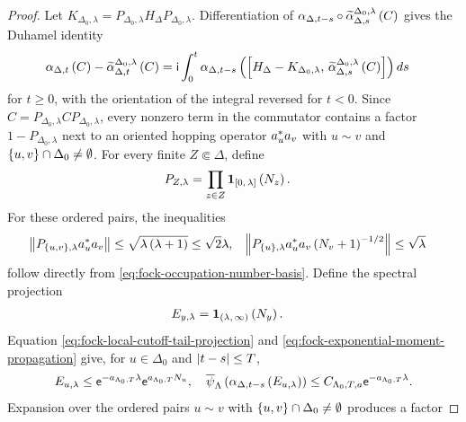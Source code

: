 \documentclass[11pt,a4paper]{article}
\theoremstyle{plain}
\theoremstyle{definition}
\theoremstyle{remark}
\begin{document}
\begin{proof}
Let $K_{\Delta_0,\lambda}=P_{\Delta_0,\lambda}H_{\Delta}P_{\Delta_0,\lambda}$.
Differentiation of
$\alpha_{\Delta,t-s}\circ\widetilde{\alpha}_{\Delta,s}^{\Delta_0,\lambda} \left( C \right)$ gives the Duhamel identity
\begin{equation}
\begin{aligned}
\fun{\alpha_{\Delta,t}}{C}
-
\fun{\widetilde{\alpha}_{\Delta,t}^{\Delta_0,\lambda}}{C}
& =
\imunit
\int_{0}^{t}
\fun{\alpha_{\Delta,t-s}}{
\commutator{
H_{\Delta}-K_{\Delta_0,\lambda}}{
\fun{\widetilde{\alpha}_{\Delta,s}^{\Delta_0,\lambda}}{C}}}
\opdmsr{s}
\end{aligned}
\label{eq:fock-cutoff-duhamel-identity}
\end{equation}
for $t\geq0$, with the orientation of the integral reversed for $t<0$.
Since $C=P_{\Delta_0,\lambda}CP_{\Delta_0,\lambda}$, every nonzero term in the commutator contains a factor
$1-P_{\Delta_0,\lambda}$ next to an oriented hopping operator $a_u^{\ast}a_v$ with
$u\sim v$ and $\left\{ u,v \right\}\cap \Delta_0\neq\emptyset$.
For every finite $Z\Subset \Delta$, define
$$\begin{aligned}
P_{Z,\lambda}
& =
\prod_{z\in Z}\boldsymbol{1}_{\left[ 0,\,\lambda \right]} \left( N_z \right).
\end{aligned}$$
For these ordered pairs, the inequalities
$$\begin{aligned}
\left\Vert P_{\left\{ u,v \right\},\lambda}a_u^{\ast}a_v \right\Vert
& \leq
\sqrt{\lambda\left( \lambda+1 \right)}
\leq
\sqrt{2}\lambda,
&
\left\Vert P_{\left\{ u \right\},\lambda}a_u^{\ast}a_v\left( N_v+1 \right)^{-1/2} \right\Vert
& \leq
\sqrt{\lambda}
\end{aligned}$$
follow directly from \eqref{eq:fock-occupation-number-basis}.
Define the spectral projection
\begin{equation}
\begin{aligned}
E_{y,\lambda}
& =
\boldsymbol{1}_{\left( \lambda,\,\infty \right)} \left( N_y \right).
\end{aligned}
\label{eq:fock-local-cutoff-tail-projection}
\end{equation}
Equation \eqref{eq:fock-local-cutoff-tail-projection} and
\eqref{eq:fock-exponential-moment-propagation} give, for $u\in \Delta_0$ and $\left| t-s \right|\leq T$,
$$\begin{aligned}
E_{u,\lambda}
\leq
\napiernum^{-a_{\Lambda_0,T}\lambda}\napiernum^{a_{\Lambda_0,T}N_u},
\quad
\fun{\oastate[\overline{\psi}_{\Lambda}]}{
\fun{\alpha_{\Delta,t-s}}{E_{u,\lambda}}}
\leq
C_{\Lambda_0,T,a}\napiernum^{-a_{\Lambda_0,T}\lambda}.
\end{aligned}$$
Expansion over the ordered pairs $u\sim v$ with $\left\{ u,v \right\}\cap \Delta_0\neq\emptyset$ produces a factor

\end{proof}
\end{document}
